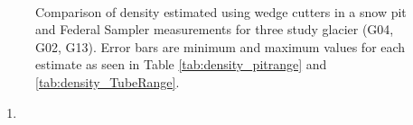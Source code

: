 \documentclass[12pt]{article}
\begin{document}
\begin{figure} 
	\centering
	\\
	\caption{Comparison of density estimated using wedge cutters in a snow pit and Federal Sampler measurements for three study glacier (G04, G02, G13). Error bars are minimum and maximum values for each estimate as seen in Table \ref{tab:density_pitrange} and \ref{tab:density_TubeRange}.}
	\label{fig:density_pitVStube}
\end{figure}




\begin{enumerate}
\item 
\end{enumerate}
\end{document}
